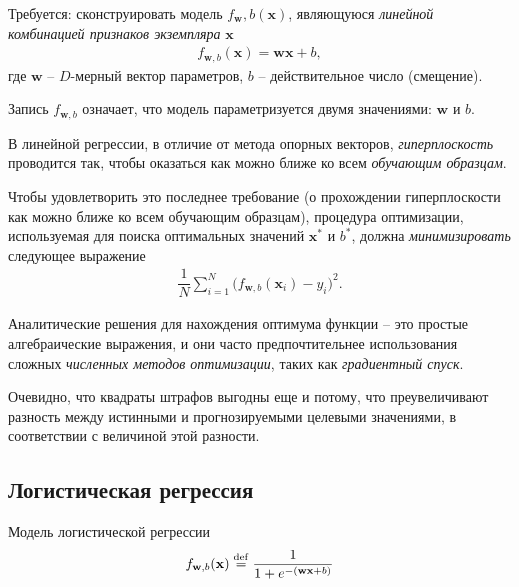 \documentclass[%
	11pt,
	a4paper,
	utf8,
		]{article}
\begin{document}
Требуется: сконструировать модель $ f_\mathbf{w}, b (\mathbf{x}) $, являющуюся \emph{линейной комбинацией признаков экземпляра} $ \mathbf{x} $
\begin{align*}
	f_{ \mathbf{w}, b } (\mathbf{x})  = \mathbf{w} \mathbf{x} + b,
\end{align*}
где $ \mathbf{w} $ -- $ D $-мерный вектор параметров, $ b $ -- действительное число (смещение).

Запись $ f_{\mathbf{w}, b} $ означает, что модель параметризуется двумя значениями: $ \mathbf{w} $ и $ b $.

В линейной регрессии, в отличие от метода опорных векторов, \emph{гиперплоскость} проводится так, чтобы оказаться как можно ближе ко всем \emph{обучающим образцам}.

Чтобы удовлетворить это последнее требование (о прохождении гиперплоскости как можно ближе ко всем обучающим образцам), процедура оптимизации, используемая для поиска оптимальных значений $ \mathbf{x}^{*} $ и $ b^{*} $, должна \emph{минимизировать} следующее выражение \cite[]{burkov:2020}
\begin{align*}
	\dfrac{1}{N} \sum_{i=1}^N \big( f_{\mathbf{w}, b} (\mathbf{x}_i) - y_i \big)^2.
\end{align*}


Аналитические решения для нахождения оптимума функции -- это простые алгебраические выражения, и они часто предпочтительнее использования сложных \emph{численных методов оптимизации}, таких как \emph{градиентный спуск}.

Очевидно, что квадраты штрафов выгодны еще и потому, что преувеличивают разность между истинными и прогнозируемыми целевыми значениями, в соответствии с величиной этой разности.

\subsection{Логистическая регрессия}

Модель логистической регрессии
\begin{align*}
	f_{ \mathbf{w}, b } (\mathbf{x}) \mathrel{\stackrel{\rm def}=} \dfrac{1}{ 1 + e^{-( \mathbf{w} \mathbf{x} + b )} }
\end{align*}
\end{document}

